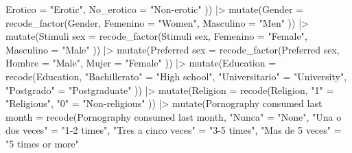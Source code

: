 \documentclass[
  bookmarksnumbered]{article}
\newenvironment{Shaded}{\begin{snugshade}}{\end{snugshade}}
\newcommand{\AttributeTok}[1]{\textcolor[rgb]{0.80,0.80,0.80}{#1}}
\newcommand{\FunctionTok}[1]{\textcolor[rgb]{0.94,0.94,0.56}{#1}}
\newcommand{\NormalTok}[1]{\textcolor[rgb]{0.80,0.80,0.80}{#1}}
\newcommand{\OtherTok}[1]{\textcolor[rgb]{0.94,0.94,0.56}{#1}}
\newcommand{\SpecialCharTok}[1]{\textcolor[rgb]{0.86,0.64,0.64}{#1}}
\newcommand{\StringTok}[1]{\textcolor[rgb]{0.80,0.58,0.58}{#1}}
\begin{document}
\begin{Shaded}
\begin{Highlighting}[]
    \AttributeTok{Erotico =} \StringTok{"Erotic"}\NormalTok{,}
    \AttributeTok{No\_erotico =} \StringTok{"Non{-}erotic"}
\NormalTok{  )) }\SpecialCharTok{|\textgreater{}}
  \FunctionTok{mutate}\NormalTok{(}\AttributeTok{Gender =} \FunctionTok{recode\_factor}\NormalTok{(Gender,}
    \AttributeTok{Femenino =} \StringTok{"Women"}\NormalTok{,}
    \AttributeTok{Masculino =} \StringTok{"Men"}
\NormalTok{  )) }\SpecialCharTok{|\textgreater{}}
  \FunctionTok{mutate}\NormalTok{(}\StringTok{\textasciigrave{}}\AttributeTok{Stimuli sex}\StringTok{\textasciigrave{}} \OtherTok{=} \FunctionTok{recode\_factor}\NormalTok{(}\StringTok{\textasciigrave{}}\AttributeTok{Stimuli sex}\StringTok{\textasciigrave{}}\NormalTok{,}
    \AttributeTok{Femenino =} \StringTok{"Female"}\NormalTok{,}
    \AttributeTok{Masculino =} \StringTok{"Male"}
\NormalTok{  )) }\SpecialCharTok{|\textgreater{}}
  \FunctionTok{mutate}\NormalTok{(}\StringTok{\textasciigrave{}}\AttributeTok{Preferred sex}\StringTok{\textasciigrave{}} \OtherTok{=} \FunctionTok{recode\_factor}\NormalTok{(}\StringTok{\textasciigrave{}}\AttributeTok{Preferred sex}\StringTok{\textasciigrave{}}\NormalTok{,}
    \AttributeTok{Hombre =} \StringTok{"Male"}\NormalTok{,}
    \AttributeTok{Mujer =} \StringTok{"Female"}
\NormalTok{  )) }\SpecialCharTok{|\textgreater{}}
  \FunctionTok{mutate}\NormalTok{(}\AttributeTok{Education =} \FunctionTok{recode}\NormalTok{(Education,}
    \StringTok{"Bachillerato"} \OtherTok{=} \StringTok{"High school"}\NormalTok{,}
    \StringTok{"Universitario"} \OtherTok{=} \StringTok{"University"}\NormalTok{,}
    \StringTok{"Postgrado"} \OtherTok{=} \StringTok{"Postgraduate"}
\NormalTok{  )) }\SpecialCharTok{|\textgreater{}}
  \FunctionTok{mutate}\NormalTok{(}\AttributeTok{Religion =} \FunctionTok{recode}\NormalTok{(Religion,}
    \StringTok{"1"} \OtherTok{=} \StringTok{"Religious"}\NormalTok{,}
    \StringTok{"0"} \OtherTok{=} \StringTok{"Non{-}religious"}
\NormalTok{  )) }\SpecialCharTok{|\textgreater{}}
  \FunctionTok{mutate}\NormalTok{(}\StringTok{\textasciigrave{}}\AttributeTok{Pornography consumed last month}\StringTok{\textasciigrave{}} \OtherTok{=} \FunctionTok{recode}\NormalTok{(}\StringTok{\textasciigrave{}}\AttributeTok{Pornography consumed last month}\StringTok{\textasciigrave{}}\NormalTok{,}
    \StringTok{"Nunca"} \OtherTok{=} \StringTok{"None"}\NormalTok{,}
    \StringTok{"Una o dos veces"} \OtherTok{=} \StringTok{"1{-}2 times"}\NormalTok{,}
    \StringTok{"Tres a cinco veces"} \OtherTok{=} \StringTok{"3{-}5 times"}\NormalTok{,}
    \StringTok{"Mas de 5 veces"} \OtherTok{=} \StringTok{"5 times or more"}

\end{Highlighting}
\end{Shaded}
\end{document}
